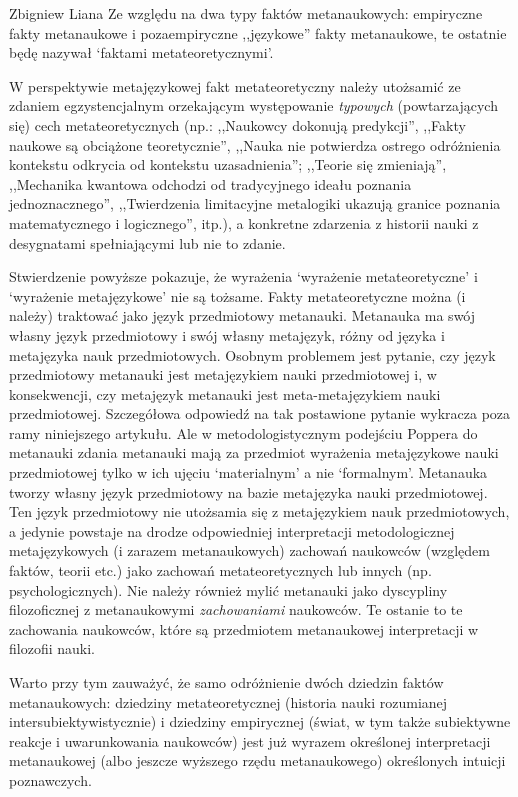 \begin{artplenv}{Zbigniew Liana}
Ze względu na dwa typy faktów metanaukowych: empiryczne fakty metanaukowe i pozaempiryczne ,,językowe'' fakty metanaukowe,
te ostatnie będę nazywał `faktami metateoretycznymi'.

W perspektywie metajęzykowej fakt metateoretyczny należy utożsamić ze zdaniem egzystencjalnym orzekającym występowanie
\textit{typowych} (powtarzających się) cech metateoretycznych (np.: ,,Naukowcy dokonują predykcji'', ,,Fakty naukowe są
obciążone teoretycznie'', ,,Nauka nie potwierdza ostrego odróżnienia kontekstu odkrycia od kontekstu uzasadnienia'';
,,Teorie się zmieniają'', ,,Mechanika kwantowa odchodzi od tradycyjnego ideału poznania jednoznacznego'', ,,Twierdzenia
limitacyjne metalogiki ukazują granice poznania matematycznego i logicznego'', itp.), a konkretne zdarzenia z historii
nauki z desygnatami spełniającymi lub nie to zdanie. 

Stwierdzenie powyższe pokazuje, że wyrażenia `wyrażenie metateoretyczne' i `wyrażenie metajęzykowe' nie są tożsame.
Fakty metateoretyczne można (i należy) traktować jako język przedmiotowy metanauki. Metanauka ma swój własny język
przedmiotowy i swój własny metajęzyk, różny od języka i metajęzyka nauk przedmiotowych. Osobnym problemem jest pytanie,
czy język przedmiotowy metanauki jest metajęzykiem nauki przedmiotowej i, w konsekwencji, czy metajęzyk metanauki jest
meta-metajęzykiem nauki przedmiotowej. Szczegółowa odpowiedź na tak postawione pytanie wykracza poza ramy niniejszego
artykułu. Ale w metodologistycznym podejściu Poppera do metanauki zdania metanauki mają za przedmiot wyrażenia
metajęzykowe nauki przedmiotowej tylko w ich ujęciu `materialnym' a nie `formalnym'. Metanauka tworzy własny język
przedmiotowy na bazie metajęzyka nauki przedmiotowej. Ten język przedmiotowy nie utożsamia się z metajęzykiem nauk
przedmiotowych, a jedynie powstaje na drodze odpowiedniej interpretacji metodologicznej metajęzykowych (i zarazem
metanaukowych) zachowań naukowców (względem faktów, teorii etc.) jako zachowań metateoretycznych lub innych (np.
psychologicznych). Nie należy również mylić metanauki jako dyscypliny filozoficznej z metanaukowymi \textit{zachowaniami}
naukowców. Te ostanie to te zachowania naukowców, które są przedmiotem metanaukowej interpretacji w filozofii nauki.

Warto przy tym zauważyć, że samo odróżnienie dwóch dziedzin faktów metanaukowych: dziedziny metateoretycznej (historia
nauki rozumianej intersubiektywistycznie) i dziedziny empirycznej (świat, w tym także subiektywne reakcje i uwarunkowania
naukowców) jest już wyrazem określonej interpretacji metanaukowej (albo jeszcze wyższego rzędu
metanaukowego) określonych intuicji poznawczych.


\end{artplenv}
